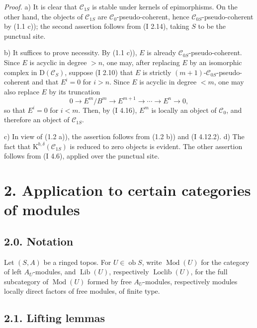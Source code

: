 \documentclass[11pt]{article}
\providecommand{\Mod}{\operatorname{Mod}}
\providecommand{\Lib}{\operatorname{Lib}}
\providecommand{\Loclib}{\operatorname{Loclib}}
\providecommand{\Ob}{\operatorname{ob}}
\begin{document}
\emph{Proof.} a) It is clear that $\mathcal C_{1S}$ is stable under kernels of epimorphisms. On the other hand, the objects of $\mathcal C_{1S}$ are $\mathcal C_0$-pseudo-coherent, hence $\mathcal C_{0S}$-pseudo-coherent by (1.1 c)); the second assertion follows from (I 2.14), taking $S$ to be the punctual site.

b) It suffices to prove necessity. By (1.1 c)), $E$ is already $\mathcal C_{0S}$-pseudo-coherent. Since $E$ is acyclic in degree $>n$, one may, after replacing $E$ by an isomorphic complex in $\mathrm D(\mathcal C_S)$, suppose (I 2.10) that $E$ is strictly $(m+1)$-$\mathcal C_{0S}$-pseudo-coherent and that $E^i=0$ for $i>n$. Since $E$ is acyclic in degree $<m$, one may also replace $E$ by its truncation
\[
0\longrightarrow E^m/B^m\longrightarrow E^{m+1}\longrightarrow\cdots\longrightarrow E^n\longrightarrow0,
\]
so that $E^i=0$ for $i<m$. Then, by (I 4.16), $E^m$ is locally an object of $\mathcal C_0$, and therefore an object of $\mathcal C_{1S}$.

c) In view of (1.2 a)), the assertion follows from (1.2 b)) and (I 4.12.2). d) The fact that $\mathrm K^{b,\delta}(\mathcal C_{1S})$ is reduced to zero objects is evident. The other assertion follows from (I 4.6), applied over the punctual site.

\section*{2. Application to certain categories of modules}

\subsection*{2.0. Notation}
Let $(S,A)$ be a ringed topos. For $U\in\Ob S$, write $\Mod(U)$ for the category of left $A_U$-modules, and $\Lib(U)$, respectively $\Loclib(U)$, for the full subcategory of $\Mod(U)$ formed by free $A_U$-modules, respectively modules locally direct factors of free modules, of finite type.

\subsection*{2.1. Lifting lemmas}
\end{document}
